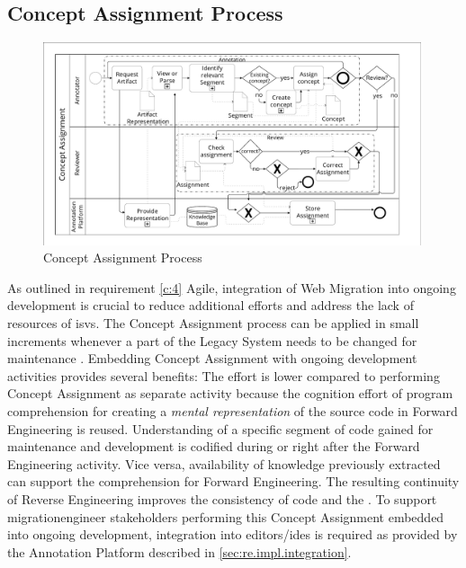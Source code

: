\vspace{-10pt}
\subsection{Concept Assignment Process}
\vspace{10pt}

\begin{figure}[h!]
\hypertarget{fig:awsm.re.concept.assignment}{%
\centering
\includegraphics[width=0.99\textwidth]{../figures/awsm-re-concept-assignment.pdf}
\caption{Concept Assignment Process}\label{fig:awsm.re.concept.assignment}
}
\end{figure}

As outlined in requirement \cref{c:4} Agile, integration of \gls{Web Migration} into ongoing development is crucial to reduce additional efforts and address the lack of resources of \glspl{isv}.
The \gls{Concept Assignment} process can be applied in small increments whenever a part of the \gls{Legacy System} needs to be changed for maintenance \autocite{Heil2016AWSM}.
Embedding \gls{Concept Assignment} with ongoing development activities provides several benefits: The effort is lower compared to performing \gls{Concept Assignment} as separate activity because the cognition effort of program comprehension for creating a \emph{mental representation} of the source code \autocite{Pennington1987Mental} in \gls{Forward Engineering} is reused.
Understanding of a specific segment of code gained for maintenance and development is codified during or right after the \gls{Forward Engineering} activity.
Vice versa, availability of knowledge previously extracted can support the comprehension for \gls{Forward Engineering}.
The resulting continuity of \gls{Reverse Engineering} improves the consistency of code and the \knowledgebase.
To support \gls{migrationengineer} stakeholders performing this \gls{Concept Assignment} embedded into ongoing development, integration into editors/\glspl{ide} is required as provided by the Annotation Platform described in \cref{sec:re.impl.integration}.

